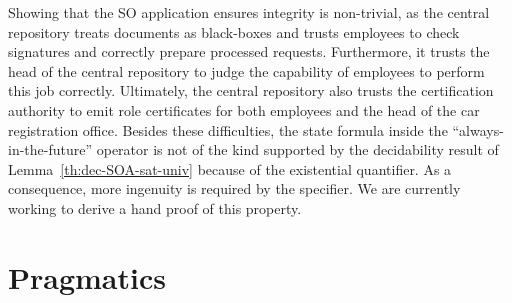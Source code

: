 \documentclass[conference]{IEEEtran}
\begin{document}
\begin{LONG}
 Showing that the SO application ensures integrity is non-trivial, as
 the central repository treats documents as black-boxes and trusts
 employees to check signatures and correctly prepare processed
 requests.  Furthermore, it trusts the head of the central repository
 to judge the capability of employees to perform this job correctly.
 Ultimately, the central repository also trusts the certification
 authority to emit role certificates for both employees and the head
 of the car registration office.  Besides these difficulties, the state
 formula inside the ``always-in-the-future'' operator is not of the
 kind supported by the decidability result of
 Lemma~\ref{th:dec-SOA-sat-univ} because of the existential
 quantifier.  As a consequence, more ingenuity is required by the
 specifier.  We are currently working to derive a hand proof of this
 property.

\section{Pragmatics}


\end{LONG}
\end{document}
